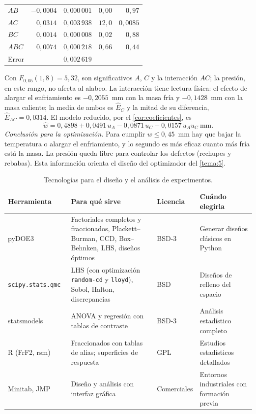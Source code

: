 \begin{ejemplo}
\begin{center}
\begin{tabular}{@{}lrrrr@{}}
$AB$ & $-0{,}0004$ & $0{,}000\,001$ & $0{,}00$ & $0{,}97$ \\
$AC$ & $0{,}0314$ & $0{,}003\,938$ & $12{,}0$ & $0{,}0085$ \\
$BC$ & $0{,}0014$ & $0{,}000\,008$ & $0{,}02$ & $0{,}88$ \\
$ABC$ & $0{,}0074$ & $0{,}000\,218$ & $0{,}66$ & $0{,}44$ \\
Error & & $0{,}002\,619$ & & \\
\bottomrule
\end{tabular}
\end{center}
Con $F_{0{,}05}(1,8)=5{,}32$, son significativos $A$, $C$ y la interacción $AC$; la presión, en este rango, no afecta al alabeo. La interacción tiene lectura física: el efecto de alargar el enfriamiento es $-0{,}2055$~mm con la masa fría y $-0{,}1428$~mm con la masa caliente; la media de ambos es $\hat E_C$ y la mitad de su diferencia, $\hat E_{AC}=0{,}0314$. El modelo reducido, por el \cref{cor:coeficientes}, es
\[
\hat w=0{,}4898+0{,}0491\,u_A-0{,}0871\,u_C+0{,}0157\,u_Au_C\ \text{mm}.
\]
\emph{Conclusión para la optimización.} Para cumplir $w\le0{,}45$~mm hay que bajar la temperatura o alargar el enfriamiento, y lo segundo es más eficaz cuanto más fría está la masa. La presión queda libre para controlar los defectos (rechupes y rebabas). Esta información orienta el diseño del optimizador del \cref{tema:5}.
\end{ejemplo}

\begin{table}[ht]
\centering\small
\begin{tabularx}{\textwidth}{@{}>{\raggedright\arraybackslash}p{2.7cm}>{\raggedright\arraybackslash}X>{\raggedright\arraybackslash}p{2.1cm}>{\raggedright\arraybackslash}p{3.4cm}@{}}
\toprule
Herramienta & Para qué sirve & Licencia & Cuándo elegirla \\
\midrule
pyDOE3~\cite{pydoe3} & Factoriales completos y fraccionados, Plackett--Burman, CCD, Box--Behnken, LHS, diseños óptimos & BSD-3 & Generar diseños clásicos en Python \\
\texttt{scipy.\allowbreak stats.\allowbreak qmc}~\cite{scipyqmc} & LHS (con optimización \texttt{random-cd} y \texttt{lloyd}), Sobol, Halton, discrepancias & BSD & Diseños de relleno del espacio \\
statsmodels & ANOVA y regresión con tablas de contraste & BSD-3 & Análisis estadístico completo \\
R (FrF2, rsm) & Fraccionados con tablas de alias; superficies de respuesta & GPL & Estudios estadísticos detallados \\
Minitab, JMP & Diseño y análisis con interfaz gráfica & Comerciales & Entornos industriales con formación previa \\
\bottomrule
\end{tabularx}
\caption{Tecnologías para el diseño y el análisis de experimentos.}
\label{tab:tec2}
\end{table}

